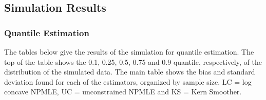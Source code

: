 \documentclass[10pt]{article}
\begin{document}
	{\subsection{Simulation Results} }
	
	{\subsubsection{Quantile Estimation} } 
	
		The tables below give the results of the simulation for quantile estimation. The top of the table shows the 0.1, 0.25, 0.5, 0.75 and 0.9 quantile, respectively, of the distribution of the simulated data. The main table shows the bias and standard deviation found for each of the estimators, organized by sample size. LC = log concave NPMLE, UC = unconstrained NPMLE and KS = Kern Smoother.
	
\end{document}
